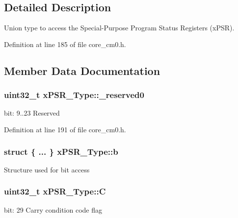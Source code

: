 \subsection{Detailed Description}
Union type to access the Special-\/\+Purpose Program Status Registers (x\+P\+SR). 

Definition at line 185 of file core\+\_\+cm0.\+h.



\subsection{Member Data Documentation}
\subsubsection[{\texorpdfstring{\+\_\+reserved0}{_reserved0}}]{\setlength{\rightskip}{0pt plus 5cm}uint32\+\_\+t x\+P\+S\+R\+\_\+\+Type\+::\+\_\+reserved0}\hypertarget{unionx_p_s_r___type_af438e0f407357e914a70b5bd4d6a97c5}{}\label{unionx_p_s_r___type_af438e0f407357e914a70b5bd4d6a97c5}
bit\+: 9..23 Reserved 

Definition at line 191 of file core\+\_\+cm0.\+h.

\subsubsection[{\texorpdfstring{b}{b}}]{\setlength{\rightskip}{0pt plus 5cm}struct \{ ... \}   x\+P\+S\+R\+\_\+\+Type\+::b}\hypertarget{unionx_p_s_r___type_a3b1063bb5cdad67e037cba993b693b70}{}\label{unionx_p_s_r___type_a3b1063bb5cdad67e037cba993b693b70}
Structure used for bit access 
\subsubsection[{\texorpdfstring{C}{C}}]{\setlength{\rightskip}{0pt plus 5cm}uint32\+\_\+t x\+P\+S\+R\+\_\+\+Type\+::C}\hypertarget{unionx_p_s_r___type_a40213a6b5620410cac83b0d89564609d}{}\label{unionx_p_s_r___type_a40213a6b5620410cac83b0d89564609d}
bit\+: 29 Carry condition code flag 

